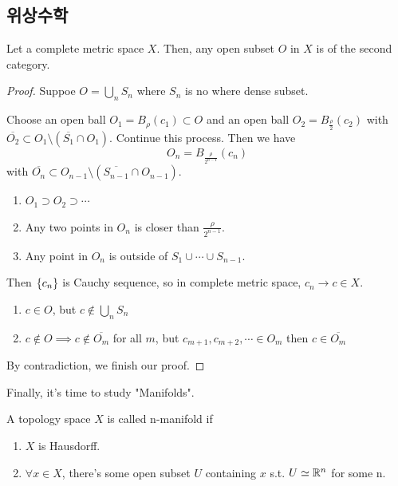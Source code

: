 \documentclass{article}
\begin{document}
\subsection{위상수학}

\begin{theorem}
    Let a complete metric space $X$. Then, any open subset $O$ in $X$ is of the second category.
\end{theorem}

\begin{proof}
    Suppoe $O=\bigcup_n S_n$ where $S_n$ is no where dense subset.

    Choose an open ball $O_1 = B_\rho(c_1) \subset O$ and an open ball $O_2 = B_{\frac{\rho}{2}}(c_2)$ with $\overline{O_2} \subset O_1 \setminus (\overline{S_1} \cap O_1)$. Continue this process. Then we have
    \[
        O_n = B_{\frac{\rho}{2^{n-1}}}(c_n)
    \] with $\overline{O_n} \subset O_{n-1}\setminus (\overline{S_{n-1}}\cap O_{n-1})$.

    \begin{enumerate}[label=\roman*.]
        \item $O_1 \supset O_2 \supset \cdots$
        \item Any two points in $O_n$ is closer than $\frac{\rho}{2^{n-1}}$.
        \item Any point in $O_n$ is outside of $S_1 \cup \cdots \cup S_{n-1}$.
    \end{enumerate}

    Then $\left\{ c_n \right\}$ is Cauchy sequence, so in complete metric space, $c_n \to c \in X$.
    \begin{enumerate}[label=\roman*.]
        \item $c \in O$, but $c \not\in \bigcup_n S_n$
        \item $c \not\in O \implies c \not\in \overline{O_m}$ for all $m$, but $c_{m+1}, c_{m+2}, \cdots \in O_m$ then $c \in \overline{O_m}$
    \end{enumerate}

    By contradiction, we finish our proof.
\end{proof}

Finally, it's time to study "Manifolds".

\begin{definition}
    A topology space $X$ is called n-manifold if
    \begin{enumerate}
        \item $X$ is Hausdorff.
        \item $\forall x \in X$, there's some open subset $U$ containing $x$ s.t. $U \simeq \mathbb{R}^n$ for some n.
    \end{enumerate}
\end{definition}
\end{document}
